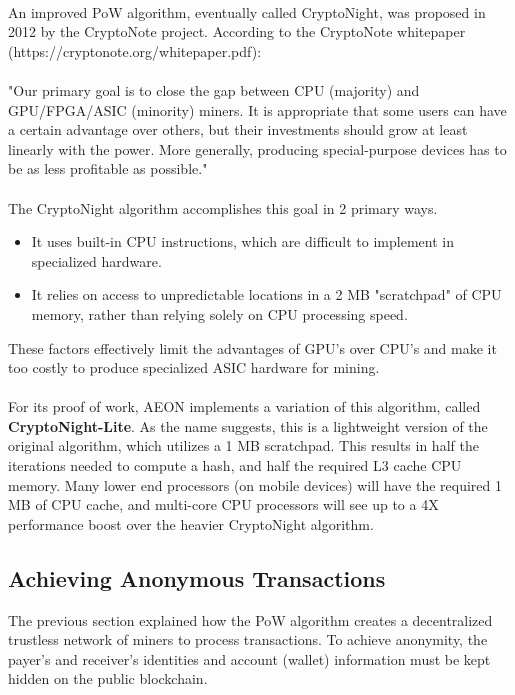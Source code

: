 \\
An improved PoW algorithm, eventually called CryptoNight, was proposed in 2012 by the CryptoNote project. According to the CryptoNote whitepaper (https://cryptonote.org/whitepaper.pdf):\\
\\
"Our primary goal is to close the gap between CPU (majority) and GPU/FPGA/ASIC (minority) miners. It is appropriate that some users can have a certain advantage over others, but their investments should grow at least linearly with the power. More generally, producing special-purpose devices has to be as less profitable as possible."\\
\\
The CryptoNight algorithm accomplishes this goal in 2 primary ways.
\begin{itemize}
	\item It uses built-in CPU instructions, which are difficult to implement in specialized hardware.
	\item It relies on access to unpredictable locations in a 2 MB "scratchpad" of CPU memory, rather than relying solely on CPU processing speed.
\end{itemize}
These factors effectively limit the advantages of GPU's over CPU's and make it too costly to produce specialized ASIC hardware for mining.\\
\\
For its proof of work, AEON implements a variation of this algorithm, called  \textbf{CryptoNight-Lite}. As the name suggests, this is a lightweight version of the original algorithm, which utilizes a 1 MB scratchpad.  This results in half the iterations needed to compute a hash, and half the required L3 cache CPU memory.  Many lower end processors (on mobile devices) will have the required 1 MB of CPU cache, and multi-core CPU processors will see up to a 4X performance boost over the heavier CryptoNight algorithm.

\subsection{Achieving Anonymous Transactions}

The previous section explained how the PoW algorithm creates a decentralized trustless network of miners to process transactions.  To achieve anonymity, the payer's and receiver's identities and account (wallet) information must be kept hidden on the public blockchain.

